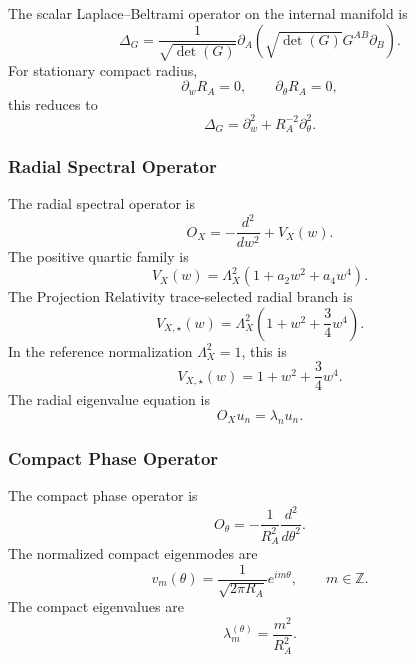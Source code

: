 \documentclass[11pt]{article}
\begin{document}
The scalar Laplace--Beltrami operator on the internal manifold is
\begin{equation}
\boxed{
\Delta_G
=
\frac{1}{\sqrt{\det(G)}}
\partial_A
\left(
\sqrt{\det(G)}
G^{AB}
\partial_B
\right).
}
\end{equation}
For stationary compact radius,
\begin{equation}
\boxed{
\partial_wR_A=0,
\qquad
\partial_\theta R_A=0,
}
\end{equation}
this reduces to
\begin{equation}
\boxed{
\Delta_G
=
\partial_w^2
+
R_A^{-2}\partial_\theta^2.
}
\end{equation}

\subsubsection{Radial Spectral Operator}
\label{app:radial-operator}

The radial spectral operator is
\begin{equation}
\boxed{
O_X
=
-\frac{d^2}{dw^2}
+
V_X(w).
}
\end{equation}
The positive quartic family is
\begin{equation}
\boxed{
V_X(w)
=
\Lambda_X^2
\left(
1+a_2w^2+a_4w^4
\right).
}
\end{equation}
The Projection Relativity trace-selected radial branch is
\begin{equation}
\boxed{
V_{X,\star}(w)
=
\Lambda_X^2
\left(
1+w^2+\frac{3}{4}w^4
\right).
}
\end{equation}
In the reference normalization \(\Lambda_X^2=1\), this is
\begin{equation}
\boxed{
V_{X,\star}(w)
=
1+w^2+\frac{3}{4}w^4.
}
\end{equation}
The radial eigenvalue equation is
\begin{equation}
\boxed{
O_Xu_n
=
\lambda_nu_n.
}
\end{equation}

\subsubsection{Compact Phase Operator}
\label{app:compact-phase-operator}

The compact phase operator is
\begin{equation}
\boxed{
O_\theta
=
-\frac{1}{R_A^2}
\frac{d^2}{d\theta^2}.
}
\end{equation}
The normalized compact eigenmodes are
\begin{equation}
\boxed{
v_m(\theta)
=
\frac{1}{\sqrt{2\pi R_A}}
e^{im\theta},
\qquad
m\in\mathbb Z.
}
\end{equation}
The compact eigenvalues are
\begin{equation}
\boxed{
\lambda_m^{(\theta)}
=
\frac{m^2}{R_A^2}.
}
\end{equation}
\end{document}
